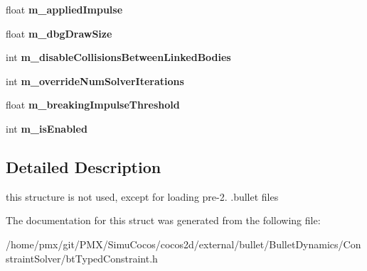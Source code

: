 \begin{DoxyCompactItemize}
\item 
\mbox{\label{structbtTypedConstraintData_aaad95a1f6b92cea9ef6385164ba1d759}} 
float {\bfseries m\+\_\+applied\+Impulse}
\item 
\mbox{\label{structbtTypedConstraintData_aaf0585171dc0c88b1af69235264c4f73}} 
float {\bfseries m\+\_\+dbg\+Draw\+Size}
\item 
\mbox{\label{structbtTypedConstraintData_a28284874673a2169d0d18ea1da9d3a1e}} 
int {\bfseries m\+\_\+disable\+Collisions\+Between\+Linked\+Bodies}
\item 
\mbox{\label{structbtTypedConstraintData_aa005bfa911ec8d84d61497edc15b8be4}} 
int {\bfseries m\+\_\+override\+Num\+Solver\+Iterations}
\item 
\mbox{\label{structbtTypedConstraintData_a6110022d869c9d7650a11805a2357091}} 
float {\bfseries m\+\_\+breaking\+Impulse\+Threshold}
\item 
\mbox{\label{structbtTypedConstraintData_a100659d6659c30e52820f7954e605881}} 
int {\bfseries m\+\_\+is\+Enabled}
\end{DoxyCompactItemize}


\subsection{Detailed Description}
this structure is not used, except for loading pre-\/2. .bullet files 

The documentation for this struct was generated from the following file\+:\begin{DoxyCompactItemize}
\item 
/home/pmx/git/\+P\+M\+X/\+Simu\+Cocos/cocos2d/external/bullet/\+Bullet\+Dynamics/\+Constraint\+Solver/bt\+Typed\+Constraint.\+h\end{DoxyCompactItemize}
